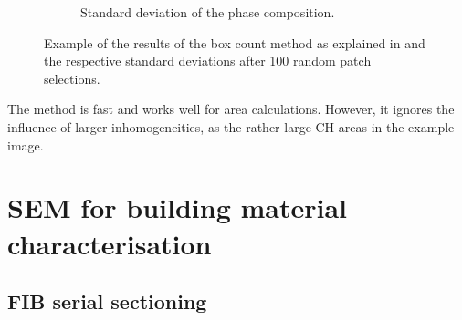 \begin{figure}[H]
\begin{subfigure}[t]{0.49\linewidth}
      \caption{Standard deviation of the phase composition.}
      \label{fig:lit_box_count_b}
    \end{subfigure}
    \caption{Example of the results of the box count method as explained in \cite{mouret.2001,hlavacek.2015} and the respective standard deviations after 100 random patch selections.}
    \label{fig:lit_box_count}
\end{figure}


The method is fast and works well for area calculations.
However, it ignores the influence of larger inhomogeneities, as the rather large \ac{CH}-areas in the example image.



\section{SEM for building material characterisation}



\subsection{FIB serial sectioning}


